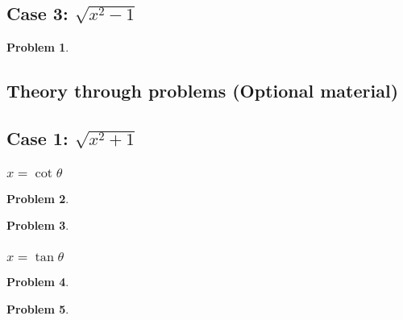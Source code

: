 \documentclass{article}
\newtheorem{problem}{Problem}
\begin{document}
\subsection{Case 3: $\sqrt{x^2-1}$}
\begin{problem}

\end{problem}


\subsection{Theory through problems (Optional material)}
\subsection{Case 1: $\sqrt{x^2+1}$}
\subsubsection{$x=\cot \theta$}
\begin{problem} 

\end{problem} 


\begin{problem} 

\end{problem} 





\subsubsection{$x=\tan \theta$}
\begin{problem} 

\end{problem} 

\begin{problem} 

\end{problem} 
\end{document}
